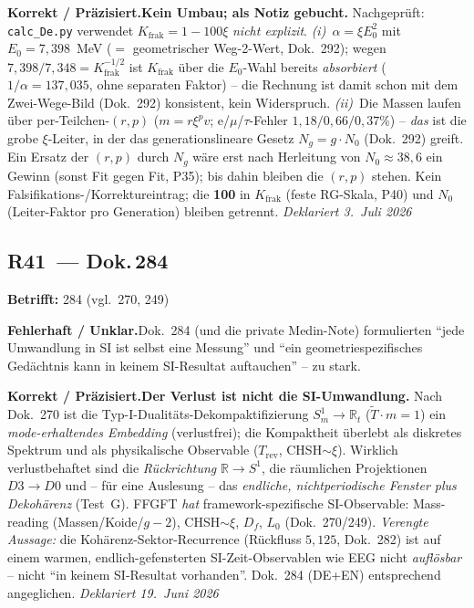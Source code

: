 \smallskip\noindent\textbf{Korrekt / Präzisiert.}\quad \textbf{Kein Umbau; als Notiz gebucht.} Nachgeprüft: \texttt{calc\_De.py} verwendet $K_{\text{frak}}=1-100\xi$ \emph{nicht explizit}. \emph{(i)}~$\alpha=\xi E_0^2$ mit $E_0=7{,}398$~MeV ($=$ geometrischer Weg-2-Wert, Dok.~292); wegen $7{,}398/7{,}348=K_{\text{frak}}^{-1/2}$ ist $K_{\text{frak}}$ über die $E_0$-Wahl bereits \emph{absorbiert} ($1/\alpha=137{,}035$, ohne separaten Faktor) -- die Rechnung ist damit schon mit dem Zwei-Wege-Bild (Dok.~292) konsistent, kein Widerspruch. \emph{(ii)}~Die Massen laufen über per-Teilchen-$(r,p)$ ($m=r\xi^p v$; e/$\mu$/$\tau$-Fehler $1{,}18/0{,}66/0{,}37\%$) -- \emph{das} ist die grobe $\xi$-Leiter, in der das generationslineare Gesetz $N_g=g\cdot N_0$ (Dok.~292) greift. Ein Ersatz der $(r,p)$ durch $N_g$ wäre erst nach Herleitung von $N_0\approx38{,}6$ ein Gewinn (sonst Fit gegen Fit, P35); bis dahin bleiben die $(r,p)$ stehen. Kein Falsifikations-/Korrektureintrag; die \textbf{100} in $K_{\text{frak}}$ (feste RG-Skala, P40) und $N_0$ (Leiter-Faktor pro Generation) bleiben getrennt. \emph{Deklariert 3.~Juli 2026}


\medskip


\subsection*{R41~--- Dok.\,284}

\noindent\textbf{Betrifft:} 284 (vgl.\ 270, 249)


\smallskip\noindent\textbf{Fehlerhaft / Unklar.}\quad Dok.~284 (und die private Medin-Note) formulierten \enquote{jede Umwandlung in SI ist selbst eine Messung} und \enquote{ein geometriespezifisches Gedächtnis kann in keinem SI-Resultat auftauchen} -- zu stark.


\smallskip\noindent\textbf{Korrekt / Präzisiert.}\quad \textbf{Der Verlust ist nicht die SI-Umwandlung.} Nach Dok.~270 ist die Typ-I-Dualitäts-Dekompaktifizierung $S^1_m\!\to\!\mathbb{R}_t$ ($\tilde{T}\cdot m=1$) ein \emph{mode-erhaltendes Embedding} (verlustfrei); die Kompaktheit überlebt als diskretes Spektrum und als physikalische Observable ($T_\text{rev}$, CHSH$\sim\xi$). Wirklich verlustbehaftet sind die \emph{Rückrichtung} $\mathbb{R}\!\to\!S^1$, die räumlichen Projektionen $D3\!\to\!D0$ und -- für eine Auslesung -- das \emph{endliche, nichtperiodische Fenster plus Dekohärenz} (Test~G). FFGFT \emph{hat} framework-spezifische SI-Observable: Mass-reading (Massen/Koide/$g\!-\!2$), CHSH$\sim\xi$, $D_f$, $L_0$ (Dok.~270/249). \emph{Verengte Aussage:} die Kohärenz-Sektor-Recurrence (Rückfluss $5{,}125$, Dok.~282) ist auf einem warmen, endlich-gefensterten SI-Zeit-Observablen wie EEG nicht \emph{auflösbar} -- nicht \enquote{in keinem SI-Resultat vorhanden}. Dok.~284 (DE+EN) entsprechend angeglichen. \emph{Deklariert 19.~Juni 2026}


